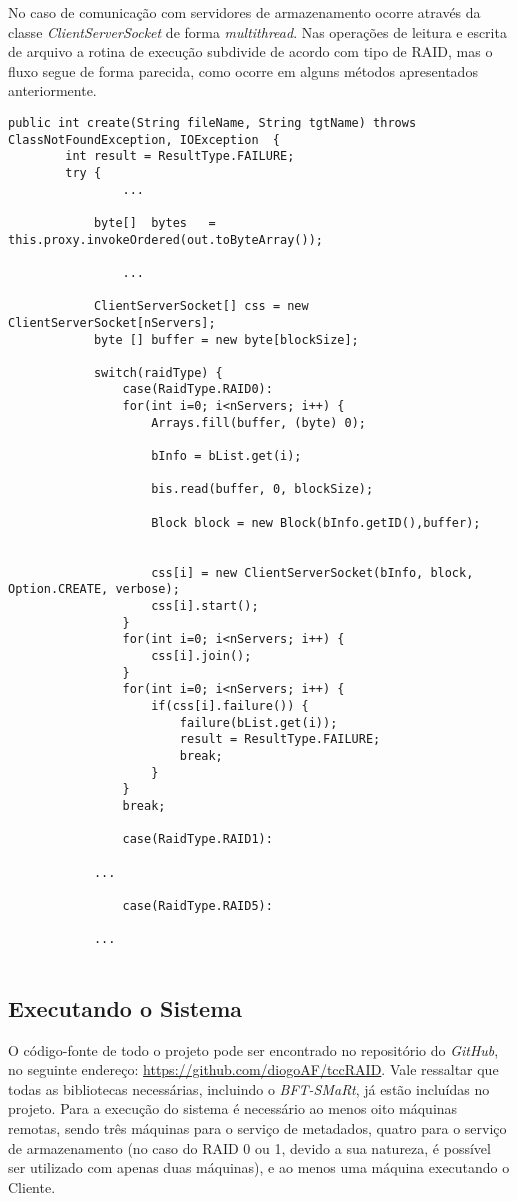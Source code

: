 No caso de comunicação com servidores de armazenamento ocorre através da classe \textit{ClientServerSocket} de forma \textit{multithread}.
Nas operações de leitura e escrita de arquivo a rotina de execução subdivide de acordo com tipo de RAID, mas o fluxo segue de forma parecida, como ocorre em alguns métodos apresentados anteriormente.
\begin{lstlisting}[basicstyle=\ttfamily\footnotesize, frame=single, caption=Exemplo de método da classe ClientDFS para operação sobre arquivos, label=code:clent_dfs2]	
	public int create(String fileName, String tgtName) throws ClassNotFoundException, IOException  {
		int result = ResultType.FAILURE;
		try {
				...
		
			byte[]  bytes   = this.proxy.invokeOrdered(out.toByteArray());
			
				...
					
			ClientServerSocket[] css = new ClientServerSocket[nServers];
			byte [] buffer = new byte[blockSize];
			
			switch(raidType) {
				case(RaidType.RAID0):
				for(int i=0; i<nServers; i++) {
					Arrays.fill(buffer, (byte) 0);
					
					bInfo = bList.get(i);
					
					bis.read(buffer, 0, blockSize);
					
					Block block = new Block(bInfo.getID(),buffer);
					
					
					css[i] = new ClientServerSocket(bInfo, block, Option.CREATE, verbose);
					css[i].start();   
				}
				for(int i=0; i<nServers; i++) {
					css[i].join();
				}
				for(int i=0; i<nServers; i++) {
					if(css[i].failure()) {
						failure(bList.get(i));
						result = ResultType.FAILURE;
						break;
					}
				}
				break;
				
				case(RaidType.RAID1):
						
			...
		
				case(RaidType.RAID5):
				
			...
			
\end{lstlisting}


\subsection{Executando o Sistema}
O código-fonte de todo o projeto pode ser encontrado no repositório do \textit{GitHub}, no seguinte endereço:  \href{https://github.com/diogoAF/tccRAID}{https://github.com/diogoAF/tccRAID}. Vale ressaltar que todas as bibliotecas necessárias, incluindo o  \textit{BFT-SMaRt}, já estão incluídas no projeto. Para a execução do sistema é necessário ao menos oito máquinas remotas, sendo três máquinas para o serviço de metadados, quatro para o serviço de armazenamento (no caso do RAID 0 ou 1, devido a sua natureza, é possível ser utilizado com apenas duas máquinas), e ao menos uma máquina executando o Cliente.
\\


